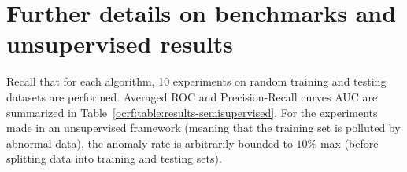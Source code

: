 % 
% 



\section{Further details on benchmarks and unsupervised results}


Recall that for each algorithm, 10 experiments on random training and testing datasets are performed. Averaged ROC and Precision-Recall curves AUC are summarized in Table~\ref{ocrf:table:results-semisupervised}.
%
For the experiments made in an unsupervised framework (meaning that the training set is polluted by abnormal data), the anomaly rate is arbitrarily bounded to $10\%$ max (before splitting data into training and testing sets).









